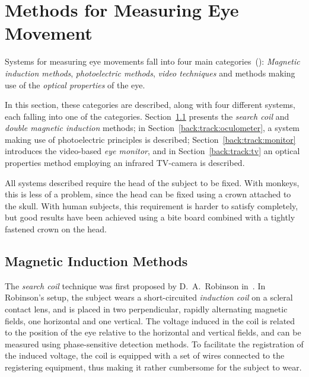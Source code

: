 
\section{Methods for Measuring Eye Movement}
\label{back:track}

Systems for measuring eye movements fall into four main
categories~(\cite{monitor}): {\em Magnetic induction methods\/}, {\em
  photoelectric methods\/}, {\em video techniques\/} and methods
making use of the {\em optical properties\/} of the eye.

In this section, these categories are described, along with four
different systems, each falling into one of the categories.
Section~\ref{back:track:coil} presents the {\em search coil\/} and
{\em double magnetic induction\/} methods; in
Section~\ref{back:track:oculometer}, a system making use of
photoelectric principles is described;
Section~\ref{back:track:monitor} introduces the video-based {\em eye
  monitor\/}, and in Section~\ref{back:track:tv} an optical properties
method employing an infrared TV-camera is described.

All systems described require the head of the subject to be fixed.
With monkeys, this is less of a problem, since the head can be fixed
using a crown attached to the skull.  With human subjects, this
requirement is harder to satisfy completely, but good results have
been achieved using a bite board combined with a tightly fastened
crown on the head.

\subsection{Magnetic Induction Methods}
\label{back:track:coil}

The {\em search coil\/} technique was first proposed by D.\ A.\ 
Robinson in~\cite{robinson}.  In Robinson's setup, the subject wears a
short-circuited {\em induction coil\/} on a scleral contact lens, and
is placed in two perpendicular, rapidly alternating magnetic fields,
one horizontal and one vertical.  The voltage induced in the coil is
related to the position of the eye relative to the horizontal and
vertical fields, and can be measured using phase-sensitive detection
methods.  To facilitate the registration of the induced voltage, the
coil is equipped with a set of wires connected to the registering
equipment, thus making it rather cumbersome for the subject to wear.

